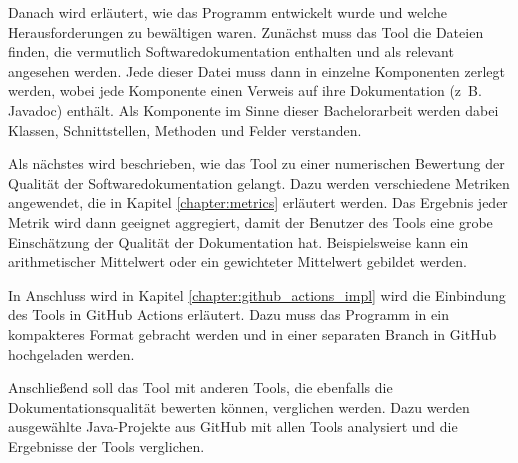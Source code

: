 Danach wird erläutert, wie das Programm entwickelt wurde und welche Herausforderungen zu bewältigen waren. Zunächst muss das Tool die Dateien finden, die vermutlich Softwaredokumentation enthalten und als relevant angesehen werden. Jede dieser Datei muss dann in einzelne Komponenten zerlegt werden, wobei jede Komponente einen Verweis auf ihre Dokumentation (z~B. Javadoc) enthält. Als Komponente im Sinne dieser Bachelorarbeit werden dabei Klassen, Schnittstellen, Methoden und Felder verstanden.

Als nächstes wird beschrieben, wie das Tool zu einer numerischen Bewertung der Qualität der Softwaredokumentation gelangt. Dazu werden verschiedene Metriken angewendet, die in Kapitel \ref{chapter:metrics} erläutert werden. Das Ergebnis jeder Metrik wird dann geeignet aggregiert, damit der Benutzer des Tools eine grobe Einschätzung der Qualität der Dokumentation hat. Beispielsweise kann ein arithmetischer Mittelwert oder ein gewichteter Mittelwert gebildet werden. 

In Anschluss wird in Kapitel \ref{chapter:github_actions_impl}  wird die Einbindung des Tools in GitHub Actions erläutert. Dazu muss das Programm in ein kompakteres Format gebracht werden und in einer separaten Branch in GitHub hochgeladen werden. 

Anschließend soll das Tool mit anderen Tools, die ebenfalls die Dokumentationsqualität bewerten können, verglichen werden. Dazu werden ausgewählte Java-Projekte aus GitHub mit allen Tools analysiert und die Ergebnisse der Tools verglichen. 


